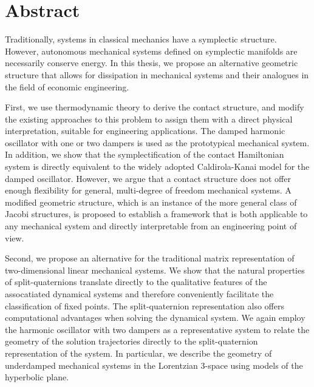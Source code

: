 \chapter*{Abstract}%

Traditionally, systems in classical mechanics have a symplectic structure. 
However, autonomous mechanical systems defined on symplectic manifolds are necessarily conserve energy.
In this thesis, we propose an alternative geometric structure that allows for dissipation in mechanical systems and their analogues in the field of economic engineering. 

First, we use thermodynamic theory to derive the contact structure, and modify the existing approaches to this problem to assign them with a direct physical interpretation, suitable for engineering applications. 
The damped harmonic oscillator with one or two dampers is used as the prototypical mechanical system. 
In addition, we show that the symplectification of the contact Hamiltonian system is directly equivalent to the widely adopted Caldirola-Kanai model for the damped oscillator.
However, we argue that a contact structure does not offer enough flexibility for general, multi-degree of freedom mechanical systems.
A modified geometric structure, which is an instance of the more general class of Jacobi structures, is proposed to establish a framework that is both applicable to any mechanical system and directly interpretable from an engineering point of view.

Second, we propose an alternative for the traditional matrix representation of two-dimensional linear mechanical systems. 
We show that the natural properties of split-quaternions translate directly to the qualitative features of the assocatiated dynamical systems and therefore conveniently facilitate the classification of fixed points. The split-quaternion representation also offers computational advantages when solving the dynamical system.
We again employ the harmonic oscillator with two dampers as a representative system to relate the geometry of the solution trajectories directly to the split-quaternion representation of the system. In particular, we describe the geometry of underdamped mechanical systems in the Lorentzian 3-space using models of the hyperbolic plane.

 
